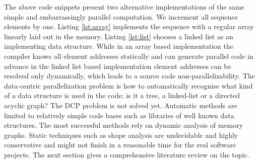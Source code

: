 \quad The above code snippets present two alternative implementations of the same simple and embarrassingly parallel computation. We increment all sequence elements by one. Listing \ref{lst:array} implements the sequence with a regular array linearly laid out in the memory. Listing \ref{lst:list} chooses a linked list as an implementing data structure. While in an array based implementation the compiler knows all element addresses statically and can generate parallel code in advance in the linked list based implementation element addresses can be resolved only dynamically, which leads to a source code non-parallelizability.\newline\null
\quad The data-centric parallelization problem is how to automatically recognise what kind of a data structure is used in the code: is it a tree, a linked-list or a directed acyclic graph? The DCP problem is not solved yet. Automatic methods are limited to relatively simple code bases such as libraries of well known data structures. The most successful methods rely on dynamic analysis of memory graphs. Static techniques such as shape analysis are undecidable and highly conservative and might not finish in a reasonable time for the real software projects. The next section gives a comprehensive literature review on the topic.
